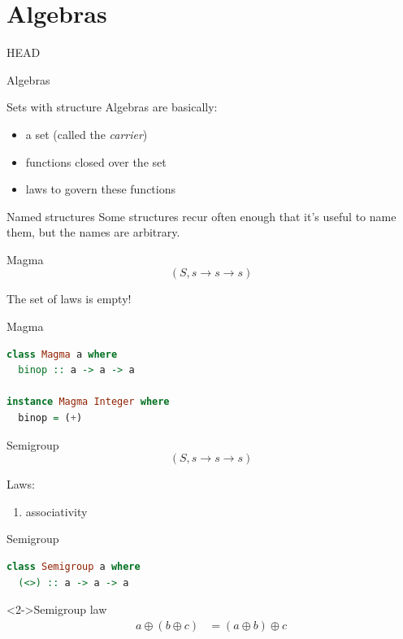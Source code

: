 \documentclass[utf8x,notes,17pt]{beamer}
\newcommand{\head}[1]{\begin{center}
\vspace{13mm}\hspace{-1mm}\Huge{{#1}}
\end{center}}
\begin{document}
\section{Algebras}
\label{sec-7}
\begin{frame}[fragile,plain,label=sec-7-1]{HEAD}
\head{Algebras}
\end{frame}
\begin{frame}[fragile,label=sec-7-2]{Sets with structure}
Algebras are basically:
\begin{itemize}
\item a set (called the \emph{carrier})
\item functions closed over the set
\item laws to govern these functions
\end{itemize}
\end{frame}
\begin{frame}[fragile,label=sec-7-3]{Named structures}
Some structures recur often enough that it's useful to name them, but the
names are arbitrary.
\end{frame}
\begin{frame}[fragile,label=sec-7-4]{Magma}
\[ (S, s → s → s) \]

\vspace{2em}
The set of laws is empty!
\end{frame}
\begin{frame}[fragile,label=sec-7-5]{Magma}
\begin{example}[\vspace*{-3.5ex}]
\begin{lstlisting}[language=Haskell]
class Magma a where
  binop :: a -> a -> a

instance Magma Integer where
  binop = (+)
\end{lstlisting}
\end{example}
\end{frame}
\begin{frame}[fragile,label=sec-7-6]{Semigroup}
\[ (S, s → s → s) \]

Laws:

\begin{enumerate}
\item associativity
\end{enumerate}
\end{frame}
\begin{frame}[fragile,label=sec-7-7]{Semigroup}
\begin{example}[\vspace*{-3.5ex}]
\begin{lstlisting}[language=Haskell]
class Semigroup a where
  (<>) :: a -> a -> a
\end{lstlisting}
\end{example}
\begin{block}<2->{Semigroup law}
\vspace{-3.5ex}
\begin{align*}
a ⊕ (b ⊕ c) &= (a ⊕ b) ⊕ c
\end{align*}
\end{block}
\end{frame}
\end{document}
